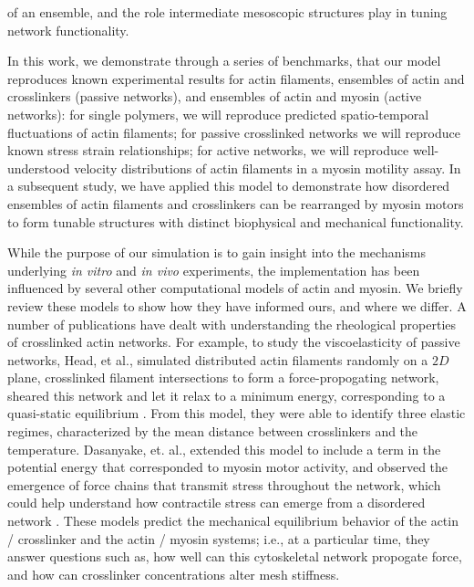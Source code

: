 \documentclass[12pt]{article}
\begin{document}
of an ensemble, and the role intermediate mesoscopic structures play in tuning network functionality.
\par
In this work, we demonstrate through a series of benchmarks, that our model 
reproduces known experimental results for actin
filaments, ensembles of actin and crosslinkers (passive networks), and ensembles of actin and myosin 
(active networks): 
for single polymers, we will reproduce predicted spatio-temporal fluctuations of actin filaments;
for passive crosslinked networks we will reproduce known stress strain
relationships; for active networks, we will reproduce well-understood velocity distributions of actin
filaments in a myosin motility assay. In a subsequent study, we have applied this model to 
demonstrate how disordered ensembles of 
actin filaments and crosslinkers can be rearranged by myosin motors to form tunable structures with distinct biophysical and
mechanical functionality\cite{freedman2016}.  
\par
While the purpose of our simulation is to gain insight into the mechanisms
underlying \textit{in vitro} and \textit{in vivo} experiments, the implementation 
has been influenced by several other computational models of actin and myosin. 
We briefly review these models to show how they have informed ours, and where we differ.
A number of publications have dealt with understanding the rheological properties of crosslinked actin
networks\cite{mackintosh1995, head2003, wilhelm2003, kim2009}.  
For example, to study the viscoelasticity of passive networks,  Head, et al., simulated distributed actin filaments randomly 
on a $2D$ plane, crosslinked filament intersections to form a force-propogating network, sheared 
this network and let it relax to a minimum energy, corresponding to a quasi-static equilibrium \cite{head2003}. 
From this model, they were able to identify three elastic regimes,
characterized by the mean distance between crosslinkers and the temperature. 
Dasanyake, et. al., extended this model to include a term in the potential energy that corresponded to
myosin motor activity, and observed the emergence of force chains that transmit stress throughout the network,
which could help understand how contractile stress can emerge from a disordered network \cite{dasanyake2011}.
These models predict the mechanical equilibrium behavior of the actin / crosslinker and the actin / myosin
systems; i.e., at a particular time, they answer questions such as, how well can this cytoskeletal network propogate
force, and how can crosslinker concentrations alter mesh stiffness.
\end{document}

